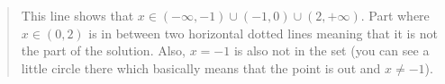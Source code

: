 \documentclass[12pt, a4paper]{article}                      %
\begin{document}
\begin{itemize}
\begin{quote}
\begin{center}
\end{center}
This line shows that $x \in (-\infty, -1) \cup (-1,0) \cup (2, +\infty)$.
Part where $x \in (0,2)$ is in between two horizontal dotted lines meaning that
it is not the part of the solution. Also, $x = -1$ is also not in the set (you can see a little circle
there which basically means that the point is out and $x \neq -1$).
\end{quote}


\end{itemize}
\end{document}
